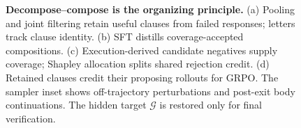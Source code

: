\begin{figure}[t]
\centering

\caption{\textbf{Decompose--compose is the organizing principle.}
(a) Pooling and joint filtering retain useful clauses from failed responses;
letters track clause identity. (b) SFT distills coverage-accepted compositions.
(c) Execution-derived candidate negatives supply coverage; Shapley allocation
splits shared rejection credit. (d) Retained clauses credit their proposing
rollouts for GRPO. The sampler inset shows off-trajectory perturbations and
post-exit body continuations. The hidden target \(\mathcal G\) is restored
only for final verification.}
\label{fig:overview}
\end{figure}
